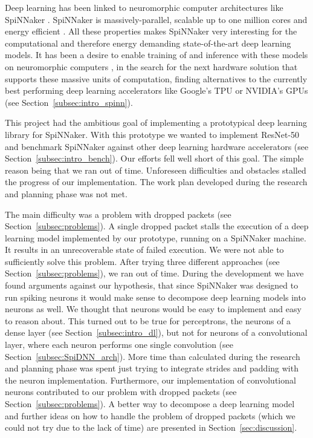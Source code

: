 \documentclass[]{article}
\begin{document}
Deep learning has been linked to neuromorphic computer architectures
like SpiNNaker \citep{gomes_2017}.
SpiNNaker is massively-parallel, scalable up to one million cores
and energy efficient \citep{furber_et_al_2020}.
All these properties makes SpiNNaker very interesting for the
computational and therefore energy demanding state-of-the-art deep
learning models.
It has been a desire to enable training of and inference with these
models on neuromorphic computers \citep{gomes_2017}, in the search for
the next hardware solution that supports these massive units of
computation, finding alternatives to the currently best performing
deep learning accelerators like Google's TPU or NVIDIA's GPUs
(see Section~\ref{subsec:intro_spinn}).

This project had the ambitious goal of implementing a prototypical
deep learning library for SpiNNaker.
With this prototype we wanted to implement ResNet-50 and benchmark
SpiNNaker against other deep learning hardware accelerators
(see Section~\ref{subsec:intro_bench}).
Our efforts fell well short of this goal.
The simple reason being that we ran out of time.
Unforeseen difficulties and obstacles stalled the progress of
our implementation.
The work plan developed during the research and planning phase was
not met.

The main difficulty was a problem with dropped packets (see
Section~\ref{subsec:problems}).
A single dropped packet stalls the execution of a deep learning model
implemented by our prototype, running on a SpiNNaker machine.
It results in an unrecoverable state of failed execution.
We were not able to sufficiently solve this problem.
After trying three different approaches (see
Section~\ref{subsec:problems}), we ran out of time.
During the development we have found arguments against our hypothesis,
that since SpiNNaker was designed to run spiking neurons it would make
sense to decompose deep learning models into neurons as well.
We thought that neurons would be easy to implement and easy to reason
about.
This turned out to be true for perceptrons, the neurons of a dense
layer (see Section~\ref{subsec:intro_dl}), but not for neurons of
a convolutional layer, where each neuron performs one single
convolution (see Section~\ref{subsec:SpiDNN_arch}).
More time than calculated during the research and planning phase was
spent just trying to integrate strides and padding with the neuron
implementation.
Furthermore, our implementation of convolutional neurons contributed
to our problem with dropped packets (see
Section~\ref{subsec:problems}).
A better way to decompose a deep learning model and further ideas on
how to handle the problem of dropped packets (which we could not try
due to the lack of time) are presented in
Section~\ref{sec:discussion}.
\end{document}
